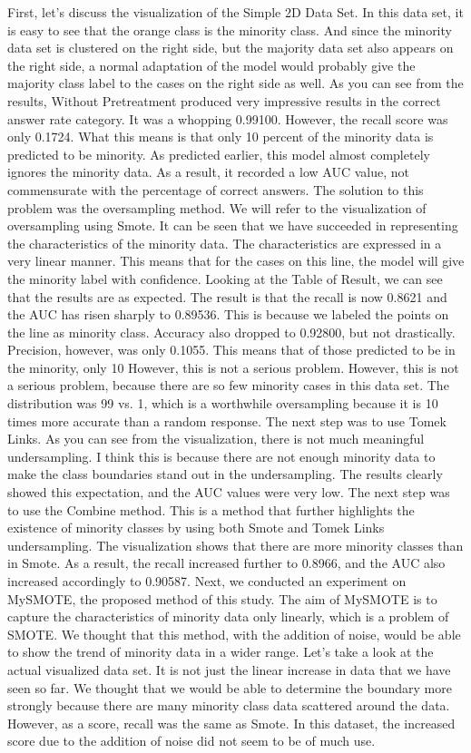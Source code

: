 First, let's discuss the visualization of the Simple 2D Data Set.
In this data set, it is easy to see that the orange class is the minority class.
And since the minority data set is clustered on the right side, but the majority data set also appears on the right side, a normal adaptation of the model would probably give the majority class label to the cases on the right side as well.
As you can see from the results, Without Pretreatment produced very impressive results in the correct answer rate category. It was a whopping 0.99100.
However, the recall score was only 0.1724.
What this means is that only 10 percent of the minority data is predicted to be minority.
As predicted earlier, this model almost completely ignores the minority data. As a result, it recorded a low AUC value, not commensurate with the percentage of correct answers.
The solution to this problem was the oversampling method.
We will refer to the visualization of oversampling using Smote.
It can be seen that we have succeeded in representing the characteristics of the minority data. The characteristics are expressed in a very linear manner.
This means that for the cases on this line, the model will give the minority label with confidence.
Looking at the Table of Result, we can see that the results are as expected.
The result is that the recall is now 0.8621 and the AUC has risen sharply to 0.89536.
This is because we labeled the points on the line as minority class.
Accuracy also dropped to 0.92800, but not drastically.
Precision, however, was only 0.1055. This means that of those predicted to be in the minority, only 10%
However, this is not a serious problem. However, this is not a serious problem, because there are so few minority cases in this data set.
The distribution was 99 vs. 1, which is a worthwhile oversampling because it is 10 times more accurate than a random response.
The next step was to use Tomek Links. As you can see from the visualization, there is not much meaningful undersampling.
I think this is because there are not enough minority data to make the class boundaries stand out in the undersampling.
The results clearly showed this expectation, and the AUC values were very low.
The next step was to use the Combine method. This is a method that further highlights the existence of minority classes by using both Smote and Tomek Links undersampling.
The visualization shows that there are more minority classes than in Smote.
As a result, the recall increased further to 0.8966, and the AUC also increased accordingly to 0.90587.
Next, we conducted an experiment on MySMOTE, the proposed method of this study.
The aim of MySMOTE is to capture the characteristics of minority data only linearly, which is a problem of SMOTE.
We thought that this method, with the addition of noise, would be able to show the trend of minority data in a wider range.
Let's take a look at the actual visualized data set. It is not just the linear increase in data that we have seen so far. We thought that we would be able to determine the boundary more strongly because there are many minority class data scattered around the data.
However, as a score, recall was the same as Smote. In this dataset, the increased score due to the addition of noise did not seem to be of much use.


